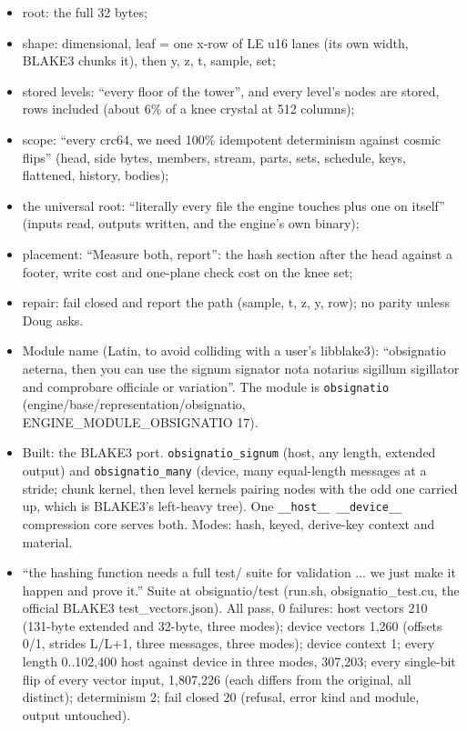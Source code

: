 \begin{itemize}
\item root: the full 32 bytes;
\item shape: dimensional, leaf = one x-row of LE u16 lanes (its own width, BLAKE3 chunks it), then y, z, t, sample, set;
\item stored levels: “every floor of the tower”, and every level's nodes are stored, rows included (about 6\% of a knee crystal at 512 columns);
\item scope: “every crc64, we need 100\% idempotent determinism against cosmic flips” (head, side bytes, members, stream, parts, sets, schedule, keys, flattened, history, bodies);
\item the universal root: “literally every file the engine touches plus one on itself” (inputs read, outputs written, and the engine's own binary);
\item placement: “Measure both, report”: the hash section after the head against a footer, write cost and one-plane check cost on the knee set;
\item repair: fail closed and report the path (sample, t, z, y, row); no parity unless Doug asks.
\item Module name (Latin, to avoid colliding with a user's libblake3): “obsignatio aeterna, then you can use the signum signator nota notarius sigillum sigillator and comprobare officiale or variation”. The module is \texttt{obsignatio} (engine/base/representation/obsignatio, ENGINE\_\allowbreak{}MODULE\_\allowbreak{}OBSIGNATIO 17).
\item Built: the BLAKE3 port. \texttt{obsignatio\_\allowbreak{}signum} (host, any length, extended output) and \texttt{obsignatio\_\allowbreak{}many} (device, many equal-length messages at a stride; chunk kernel, then level kernels pairing nodes with the odd one carried up, which is BLAKE3's left-heavy tree). One \texttt{\_\allowbreak{}\_\allowbreak{}host\_\allowbreak{}\_\allowbreak{} \_\allowbreak{}\_\allowbreak{}device\_\allowbreak{}\_\allowbreak{}} compression core serves both. Modes: hash, keyed, derive-key context and material.
\item “the hashing function needs a full test/ suite for validation ... we just make it happen and prove it.” Suite at obsignatio/test (run.sh, obsignatio\_\allowbreak{}test.cu, the official BLAKE3 test\_\allowbreak{}vectors.json). All pass, 0 failures: host vectors 210 (131-byte extended and 32-byte, three modes); device vectors 1,260 (offsets 0/1, strides L/L+1, three messages, three modes); device context 1; every length 0..102,400 host against device in three modes, 307,203; every single-bit flip of every vector input, 1,807,226 (each differs from the original, all distinct); determinism 2; fail closed 20 (refusal, error kind and module, output untouched).

\end{itemize}
